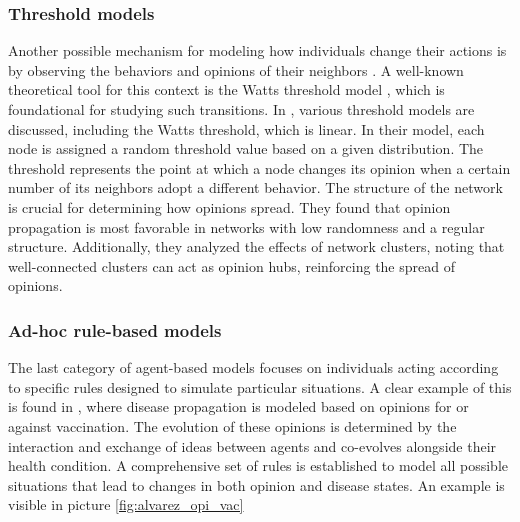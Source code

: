 \subsubsection{Threshold models}
Another possible mechanism for modeling how individuals change their actions is by observing the behaviors and opinions of their neighbors \cite{Granovetter_1978, Krassa_1988}. A well-known theoretical tool for this context is the Watts threshold model \cite{Watts_2002}, which is foundational for studying such transitions.
In \cite{Wang_2019}, various threshold models are discussed, including the Watts threshold, which is linear. In their model, each node is assigned a random threshold value based on a given distribution. The threshold represents the point at which a node changes its opinion when a certain number of its neighbors adopt a different behavior. The structure of the network is crucial for determining how opinions spread. They found that opinion propagation is most favorable in networks with low randomness and a regular structure. Additionally, they analyzed the effects of network clusters, noting that well-connected clusters can act as opinion hubs, reinforcing the spread of opinions.

\subsubsection{Ad-hoc rule-based models}
The last category of agent-based models focuses on individuals acting according to specific rules designed to simulate particular situations. A clear example of this is found in \cite{Alvarez_Zuzek_2017}, where disease propagation is modeled based on opinions for or against vaccination. The evolution of these opinions is determined by the interaction and exchange of ideas between agents and co-evolves alongside their health condition. A comprehensive set of rules is established to model all possible situations that lead to changes in both opinion and disease states. An example is visible in picture \ref{fig:alvarez_opi_vac}


